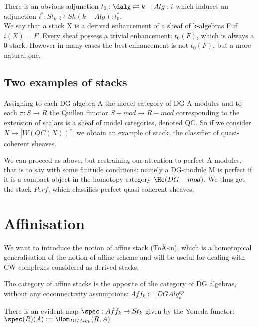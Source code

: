 \begin{rmk}
There is an obvious adjunction $t_0:\dalg\rightleftarrows k-Alg:i$ which induces an adjunction $i^*:St_k\rightleftarrows Sh(k-Alg):t_0^*$.\\
We say that a stack X is a derived enhancement of a sheaf of k-algebras F if $i(X)=F$. Every sheaf possess a trivial enhancement: $t_0(F)$, which
is always a 0-stack.
However in many cases the best enhancement is not $t_0(F)$, but a more natural one.
\end{rmk}


\subsection{Two examples of stacks}

\begin{defin}
Assigning to each DG-algebra A the model category of DG A-modules and to each $\pi: S\to R$ the Quillen functor $S-mod\to R-mod$ corresponding to the extension of scalars
is a sheaf of model categories, denoted QC. So if we consider $X\mapsto |W(QC(X))^c|$ we obtain an example of stack, the classifier of quasi-coherent sheaves. 
\end{defin}

\begin{defin}
We can proceed as above, but restraining our attention to perfect A-modules, that is to say with some finitude conditions: namely a DG-module M is perfect if it is a compact object
in the homotopy category $\Ho(DG-mod)$. We thus get the stack $Perf$, which classifies perfect quasi coherent sheaves.
\end{defin}

\section{Affinisation}

We want to introduce the notion of affine stack (ToÃ«n), which is a homotopical generalisation of the notion of affine scheme and will be useful for dealing
with CW complexes considered as derived stacks.\\
\begin{defin}
The category of affine stacks is the opposite of the category of DG algebras, without any coconnectivity assumptions: $Aff_k:=DGAlg_k^{op}$
\end{defin}

\begin{rmk}
There is an evident map $\spec: Aff_k \to St_k $ given by the Yoneda functor: $\spec(R)(A):=\Hom_{DGAlg_k}(R,A)$
\end{rmk}

